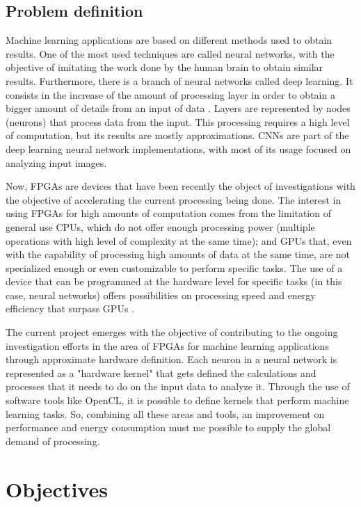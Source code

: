 \subsection{Problem definition}

Machine learning applications are based on different methods used to obtain results.
One of the most used techniques are called neural networks, with the objective of imitating the work
done by the human brain to obtain similar results. Furthermore, there is a branch of neural networks
called deep learning. It consists in the increase of the amount of processing layer in order to obtain
a bigger amount of details from an input of data \cite{deeplearningoverview}. Layers are represented by nodes (neurons)
that process data from the input. This processing requires a high level of computation, but its
results are mostly approximations. CNNs are part of the deep learning neural network implementations, with most
of its usage focused on analyzing input images.

Now, FPGAs are devices that have been recently the object of investigations with the objective of accelerating
the current processing being done. The interest in using FPGAs for high amounts of computation comes from
the limitation of general use CPUs, which do not offer enough processing power (multiple operations with 
high level of complexity at the same time); and GPUs that, even with the capability of processing high
amounts of data at the same time, are not specialized enough or even customizable to perform specific tasks.
The use of a device that can be programmed at the hardware level for specific tasks (in this case, neural networks)
offers possibilities on processing speed and energy efficiency that surpass GPUs \cite{surveyfpgann}.

The current project emerges with the objective of contributing to the ongoing investigation efforts
in the area of FPGAs for machine learning applications through approximate hardware definition.
Each neuron in a neural network is represented as a "hardware kernel" that gets defined the 
calculations and processes that it needs to do on the input data to analyze it.
Through the use of software tools like OpenCL, it is possible to define kernels that perform
machine learning tasks. So, combining all these areas and tools, an improvement on performance and
energy consumption must me possible to supply the global demand of processing.

\section{Objectives}

